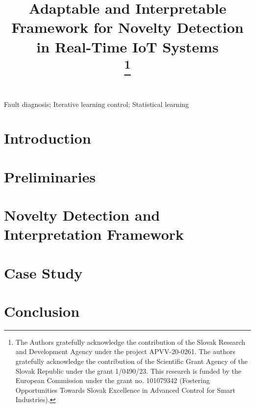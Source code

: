 \documentclass[conference]{IEEEtran}
\begin{document}
\title{\vspace{0.25in}Adaptable and Interpretable Framework for Novelty Detection in Real-Time IoT Systems\\
\thanks{The Authors gratefully acknowledge the contribution of the Slovak Research and Development Agency under the project APVV-20-0261. The authors gratefully acknowledge the contribution of the Scientific Grant Agency of the Slovak Republic under the grant 1/0490/23. This research is funded by the European Commission under the grant no. 101079342 (Fostering Opportunities Towards Slovak Excellence in Advanced Control for Smart Industries).}
}

\author{
}

\maketitle

\begin{abstract}

\end{abstract}

\begin{IEEEkeywords}
Fault diagnosis; Iterative learning control; Statistical learning
\end{IEEEkeywords}

\section{Introduction}\label{Introduction}


\section{Preliminaries}


\section{Novelty Detection and Interpretation Framework}


\section{Case Study}


\section{Conclusion}




\end{document}
